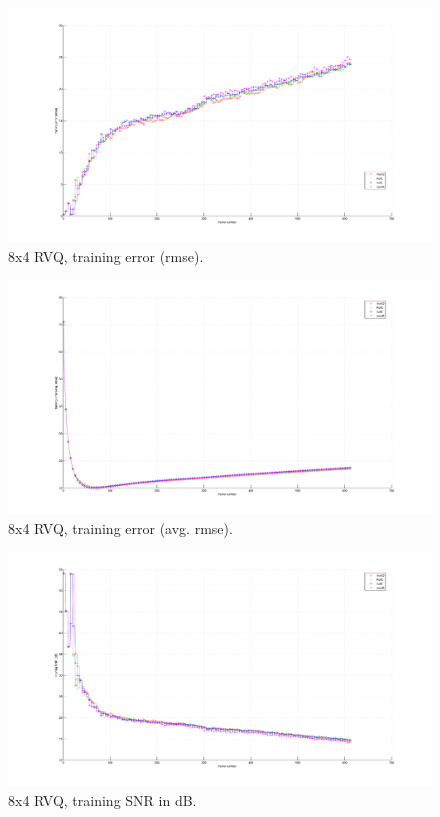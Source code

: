 								\begin{figure}[h!]
								\centering
								\includegraphics[height=0.4\textheight]{thesis/3_sylv_8_4_1000_trg_rmse.pdf}
								\caption{8x4 RVQ, training error (rmse).}
								\label{fig:3_sylv_8_4_1000_trg_rmse}
								\end{figure}


								\begin{figure}[h!]
								\centering
								\includegraphics[height=0.4\textheight]{thesis/3_sylv_8_4_1000_trg_armse.pdf}
								\caption{8x4 RVQ, training error (avg. rmse).}
								\label{fig:3_sylv_8_4_1000_trg_armse}
								\end{figure}

								\begin{figure}[h!]
								\centering
								\includegraphics[height=0.4\textheight]{thesis/3_sylv_8_4_1000_trg_SNRdB.pdf}
								\caption{8x4 RVQ, training SNR in dB.}
								\label{fig:3_sylv_8_4_1000_trg_SNRdB}
								\end{figure}
\clearpage
\newpage
